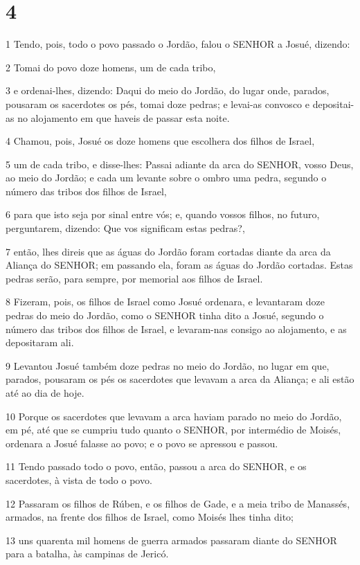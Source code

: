 \chapter{4}

\par 1 Tendo, pois, todo o povo passado o Jordão, falou o SENHOR a Josué, dizendo:
\par 2 Tomai do povo doze homens, um de cada tribo,
\par 3 e ordenai-lhes, dizendo: Daqui do meio do Jordão, do lugar onde, parados, pousaram os sacerdotes os pés, tomai doze pedras; e levai-as convosco e depositai-as no alojamento em que haveis de passar esta noite.
\par 4 Chamou, pois, Josué os doze homens que escolhera dos filhos de Israel,
\par 5 um de cada tribo, e disse-lhes: Passai adiante da arca do SENHOR, vosso Deus, ao meio do Jordão; e cada um levante sobre o ombro uma pedra, segundo o número das tribos dos filhos de Israel,
\par 6 para que isto seja por sinal entre vós; e, quando vossos filhos, no futuro, perguntarem, dizendo: Que vos significam estas pedras?,
\par 7 então, lhes direis que as águas do Jordão foram cortadas diante da arca da Aliança do SENHOR; em passando ela, foram as águas do Jordão cortadas. Estas pedras serão, para sempre, por memorial aos filhos de Israel.
\par 8 Fizeram, pois, os filhos de Israel como Josué ordenara, e levantaram doze pedras do meio do Jordão, como o SENHOR tinha dito a Josué, segundo o número das tribos dos filhos de Israel, e levaram-nas consigo ao alojamento, e as depositaram ali.
\par 9 Levantou Josué também doze pedras no meio do Jordão, no lugar em que, parados, pousaram os pés os sacerdotes que levavam a arca da Aliança; e ali estão até ao dia de hoje.
\par 10 Porque os sacerdotes que levavam a arca haviam parado no meio do Jordão, em pé, até que se cumpriu tudo quanto o SENHOR, por intermédio de Moisés, ordenara a Josué falasse ao povo; e o povo se apressou e passou.
\par 11 Tendo passado todo o povo, então, passou a arca do SENHOR, e os sacerdotes, à vista de todo o povo.
\par 12 Passaram os filhos de Rúben, e os filhos de Gade, e a meia tribo de Manassés, armados, na frente dos filhos de Israel, como Moisés lhes tinha dito;
\par 13 uns quarenta mil homens de guerra armados passaram diante do SENHOR para a batalha, às campinas de Jericó.
